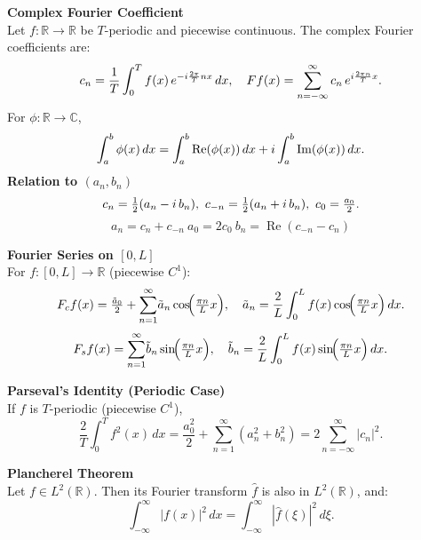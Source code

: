 \documentclass[8pt]{article}
\begin{document}
\begin{multicols}{2}
	\columnbreak

	\noindent \textbf{Complex Fourier Coefficient}\\
	Let \( f : \mathbb{R} \to \mathbb{R} \) be \( T \)-periodic and piecewise continuous.  The complex Fourier coefficients are:
	\[
		c_n = \frac{1}{T} \int_0^T f(x)\, e^{-i \frac{2\pi}{T} n x} \, dx,
		\quad
		Ff(x) = \sum_{n=-\infty}^{\infty} c_{n}\,e^{i\frac{2\pi n}{T}x}.\vspace{-10px}
	\]
	For \( \phi : \mathbb{R} \to \mathbb{C} \), \vspace{-5px}
	\[ \int_a^b \phi(x)\,dx
		= \int_a^b \operatorname{Re}(\phi(x)) \, dx + i \int_a^b \operatorname{Im}(\phi(x)) \, dx. \vspace{-5px}
	\]
	\noindent \textbf{Relation to \( (a_n, b_n) \)}\quad
	\[ \vspace{-5px}
		c_{n} = \tfrac{1}{2}(a_{n} - i\,b_{n}),\
		c_{-n} = \tfrac{1}{2}(a_{n} + i\,b_{n}),\
		c_{0} = \tfrac{a_{0}}{2}.\]\[
		a_{n} = c_n + c_{-n}\
		a_{0} = 2 c_0 \
		b_n = \operatorname{Re}(c_{-n} - c_n)
	\]

	\noindent \textbf{Fourier Series on $[0,L]$}\\
	For $f:[0,L]\to \mathbb{R}$ (piecewise $C^1$):
	\[
		F_{c}f(x)=\tfrac{\tilde a_{0}}{2} + \sum_{n=1}^{\infty}\!\tilde a_{n}\cos\!\Bigl(\tfrac{\pi n}{L}x\Bigr),
		\quad \tilde a_{n}=\frac{2}{L}\int_{0}^{L} f(x)\cos\!\Bigl(\tfrac{\pi n}{L}x\Bigr)\,dx.
	\]
	\[
		F_{s}f(x)=\sum_{n=1}^{\infty}\!\tilde b_{n}\sin\!\Bigl(\tfrac{\pi n}{L}x\Bigr),
		\quad \tilde b_{n}=\frac{2}{L}\int_{0}^{L} f(x)\sin\!\Bigl(\tfrac{\pi n}{L}x\Bigr)\,dx.
	\]

	\noindent \textbf{Parseval's Identity (Periodic Case)}\\
	If $f$ is $T$-periodic (piecewise $C^1$),
	\[
		\frac{2}{T}\int_{0}^{T} f^{2}(x)\,dx
		= \frac{a_{0}^{2}}{2} + \sum_{n=1}^{\infty}(a_{n}^{2}+b_{n}^{2})
		= 2\sum_{n=-\infty}^{\infty}\!\!\bigl|c_{n}\bigr|^{2}.
	\]

	\noindent \textbf{Plancherel Theorem}\\
	Let $f \in L^2(\mathbb{R})$. Then its Fourier transform $\hat{f}$ is also in $L^2(\mathbb{R})$, and:
	\[
		\int_{-\infty}^\infty |f(x)|^2 \, dx
		= \int_{-\infty}^\infty |\hat{f}(\xi)|^2 \, d\xi.
	\]


\end{multicols}
\end{document}
